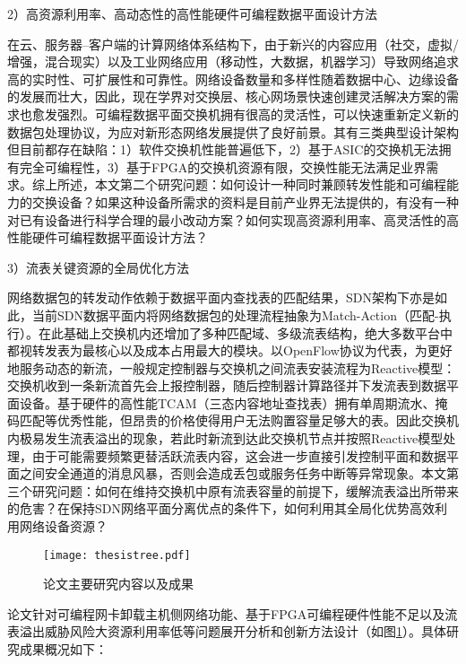 2）高资源利用率、高动态性的高性能硬件可编程数据平面设计方法

在云、服务器--客户端的计算网络体系结构下，由于新兴的内容应用（社交，虚拟/增强，混合现实）以及工业网络应用（移动性，大数据，机器学习）导致网络追求高的实时性、可扩展性和可靠性。网络设备数量和多样性随着数据中心、边缘设备的发展而壮大，因此，现在学界对交换层、核心网场景快速创建灵活解决方案的需求也愈发强烈。可编程数据平面交换机拥有很高的灵活性，可以快速重新定义新的数据包处理协议，为应对新形态网络发展提供了良好前景。其有三类典型设计架构但目前都存在缺陷：1）软件交换机性能普遍低下，2）基于ASIC的交换机无法拥有完全可编程性，3）基于FPGA的交换机资源有限，交换性能无法满足业界需求。综上所述，本文第二个研究问题：如何设计一种同时兼顾转发性能和可编程能力的交换设备？如果这种设备所需求的资料是目前产业界无法提供的，有没有一种对已有设备进行科学合理的最小改动方案？如何实现高资源利用率、高灵活性的高性能硬件可编程数据平面设计方法？

3）流表关键资源的全局优化方法

网络数据包的转发动作依赖于数据平面内查找表的匹配结果，SDN架构下亦是如此，当前SDN数据平面内将网络数据包的处理流程抽象为Match-Action（匹配-执行）。在此基础上交换机内还增加了多种匹配域、多级流表结构，绝大多数平台中都视转发表为最核心以及成本占用最大的模块。以OpenFlow协议为代表，为更好地服务动态的新流，一般规定控制器与交换机之间流表安装流程为Reactive模型：交换机收到一条新流首先会上报控制器，随后控制器计算路径并下发流表到数据平面设备。基于硬件的高性能TCAM（三态内容地址查找表）拥有单周期流水、掩码匹配等优秀性能，但昂贵的价格使得用户无法购置容量足够大的表。因此交换机内极易发生流表溢出的现象，若此时新流到达此交换机节点并按照Reactive模型处理，由于可能需要频繁更替活跃流表内容，这会进一步直接引发控制平面和数据平面之间安全通道的消息风暴，否则会造成丢包或服务任务中断等异常现象。本文第三个研究问题：如何在维持交换机中原有流表容量的前提下，缓解流表溢出所带来的危害？在保持SDN网络平面分离优点的条件下，如何利用其全局化优势高效利用网络设备资源？


\label{chap14}
\begin{figure}[!ht]
	\centering
	\texttt{[image: thesistree.pdf]}
	\caption{论文主要研究内容以及成果} \label{fig:thesistree}
\end{figure}

论文针对可编程网卡卸载主机侧网络功能、基于FPGA可编程硬件性能不足以及流表溢出威胁风险大资源利用率低等问题展开分析和创新方法设计（如图\ref{fig:thesistree}）。具体研究成果概况如下：


